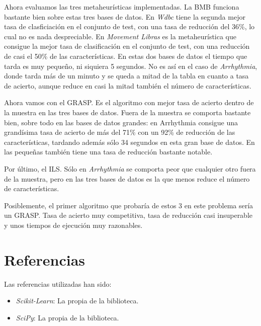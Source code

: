 \documentclass[a4paper, 11pt]{article}
\begin{document}
    Ahora evaluamos las tres metaheurísticas implementadas. La BMB funciona bastante bien sobre estas tres bases de datos. En \emph{Wdbc} tiene la segunda mejor tasa de clasficiación en el conjunto de test, con una tasa de reducción del 36\%, lo cual no es nada despreciable. En \emph{Movement Libras} es la metaheurística que consigue la mejor tasa de clasificación en el conjunto de test, con una reducción de casi el 50\% de las características. En estas dos bases de datos el tiempo que tarda es muy pequeño, ni siquiera 5 segundos. No es así en el caso de \emph{Arrhythmia}, donde tarda más de un minuto y se queda a mitad de la tabla en cuanto a tasa de acierto, aunque reduce en casi la mitad también el número de características.

    Ahora vamos con el GRASP. Es el algoritmo con mejor tasa de acierto dentro de la muestra en las tres bases de datos. Fuera de la muestra se comporta bastante bien, sobre todo en las bases de datos grandes: en Arrhythmia consigue una grandísima tasa de acierto de más del 71\% con un 92\% de reducción de las características, tardando además sólo 34 segundos en esta gran base de datos. En las pequeñas también tiene una tasa de reducción bastante notable.

    Por último, el ILS. Sólo en \emph{Arrhythmia} se comporta peor que cualquier otro fuera de la muestra, pero en las tres bases de datos es la que menos reduce el número de características.

    Posiblemente, el primer algoritmo que probaría de estos 3 en este problema sería un GRASP. Tasa de acierto muy competitiva, tasa de reducción casi insuperable y unos tiempos de ejecución muy razonables.


  \section{Referencias}

  Las referencias utilizadas han sido:
  \begin{itemize}
    \item \emph{Scikit-Learn}: La propia  de la biblioteca.
    \item \emph{SciPy}: La propia  de la biblioteca.
  \end{itemize}
\end{document}
